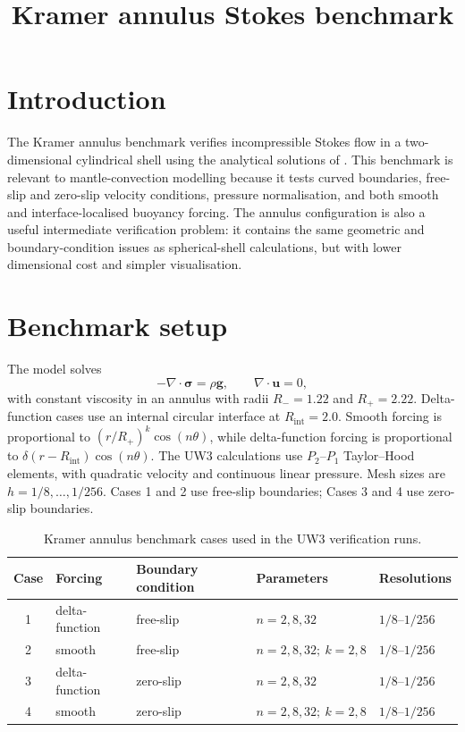 \documentclass[11pt,a4paper]{article}
\title{Kramer annulus Stokes benchmark}
\author{}
\date{}
\begin{document}
\maketitle
\vspace{-2.0em}

\section{Introduction}

The Kramer annulus benchmark verifies incompressible Stokes flow in a two-dimensional cylindrical shell using the analytical solutions of \citet{kramer2021}. This benchmark is relevant to mantle-convection modelling because it tests curved boundaries, free-slip and zero-slip velocity conditions, pressure normalisation, and both smooth and interface-localised buoyancy forcing. The annulus configuration is also a useful intermediate verification problem: it contains the same geometric and boundary-condition issues as spherical-shell calculations, but with lower dimensional cost and simpler visualisation.

\section{Benchmark setup}

The model solves
\[
  -\nabla\cdot\boldsymbol{\sigma}=\rho\mathbf{g},
  \qquad
  \nabla\cdot\mathbf{u}=0,
\]
with constant viscosity in an annulus with radii \(R_-=1.22\) and \(R_+=2.22\). Delta-function cases use an internal circular interface at \(R_{\mathrm{int}}=2.0\). Smooth forcing is proportional to \((r/R_+)^k\cos(n\theta)\), while delta-function forcing is proportional to \(\delta(r-R_{\mathrm{int}})\cos(n\theta)\). The UW3 calculations use \(P_2\)--\(P_1\) Taylor--Hood elements, with quadratic velocity and continuous linear pressure. Mesh sizes are \(h=1/8,\ldots,1/256\). Cases 1 and 2 use free-slip boundaries; Cases 3 and 4 use zero-slip boundaries.

\begin{table}[H]
\centering
\caption{Kramer annulus benchmark cases used in the UW3 verification runs.}
\label{tab:annulus_cases}
\begin{tabular}{cllll}
\toprule
Case & Forcing & Boundary condition & Parameters & Resolutions \\
\midrule
1 & delta-function & free-slip & \(n=2,8,32\) & \(1/8\)--\(1/256\) \\
2 & smooth & free-slip & \(n=2,8,32;\ k=2,8\) & \(1/8\)--\(1/256\) \\
3 & delta-function & zero-slip & \(n=2,8,32\) & \(1/8\)--\(1/256\) \\
4 & smooth & zero-slip & \(n=2,8,32;\ k=2,8\) & \(1/8\)--\(1/256\) \\
\bottomrule
\end{tabular}
\end{table}
\end{document}
